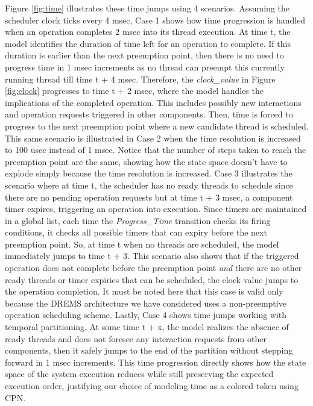Figure \ref{fig:time} illustrates these time jumps using 4 scenarios. Assuming the scheduler clock ticks every 4 msec, Case 1 shows how time progression is handled when an operation completes 2 msec into its thread execution. At time t, the model identifies the duration of time left for an operation to complete. If this duration is earlier than the next preemption point, then there is no need to progress time in 1 msec increments as no thread can preempt this currently running thread till time t + 4 msec. Therefore, the \emph{clock\_value} in Figure \ref{fig:clock} progresses to time t + 2 msec, where the model handles the implications of the completed operation. This includes possibly new interactions and operation requests triggered in other components. Then, time is forced to progress to the next preemption point where a new candidate thread is scheduled. This same scenario is illustrated in Case 2 when the time resolution is increased to 100 usec instead of 1 msec. Notice that the number of steps taken to reach the preemption point are the same, showing how the state space doesn't have to explode simply because the time resolution is increased. Case 3 illustrates the scenario where at time t, the scheduler has no ready threads to schedule since there are no pending operation requests but at time t + 3 msec, a component timer expires, triggering an operation into execution. Since timers are maintained in a global list, each time the \emph{Progress\_Time} transition checks its firing conditions, it checks all possible timers that can expiry before the next preemption point. So, at time t when no threads are scheduled, the model immediately jumps to time t + 3. This scenario also shows that if the triggered operation does not complete before the preemption point \emph{and} there are no other ready threads or timer expiries that can be scheduled, the clock value jumps to the operation completion. It must be noted here that this case is valid only because the DREMS architecture we have considered uses a non-preemptive operation scheduling scheme. Lastly, Case 4 shows time jumps working with temporal partitioning. At some time t + x, the model realizes the absence of ready threads and does not foresee any interaction requests from other components, then it safely jumps to the end of the partition without stepping forward in 1 msec increments. This time progression directly shows how the state space of the system execution reduces while still preserving the expected execution order, justifying our choice of modeling time as a colored token using CPN. 

